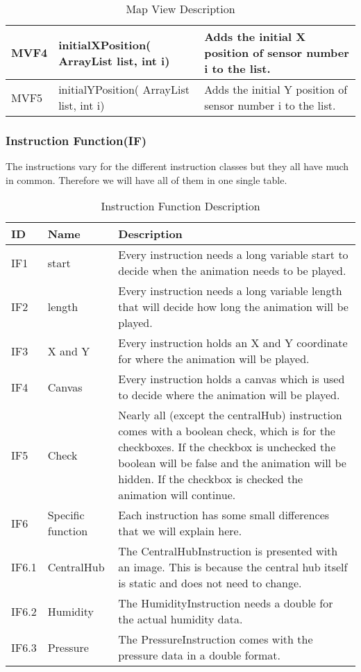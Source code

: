 \documentclass[../document]{subfiles}
\begin{document}
\begin{table}[H]
\caption{Map View Description}
\centering
\begin{tabularx}{\textwidth}{|l|L{3.5cm}|X|}
	\hline
	MVF4
	&initialXPosition( ArrayList list, int i)
	&Adds the initial X position of sensor number i to the list.
	\\ \hline MVF5
	&initialYPosition( ArrayList list, int i)
	&Adds the initial Y position of sensor number i to the list.
	\\ \hline 
\end{tabularx}
\end{table}

\subsubsection{Instruction Function(IF)}
The instructions vary for the different instruction classes but they all have much in common. Therefore we will have all of them in one single table.
\begin{table}[H]
\caption{Instruction Function Description}
\centering
\begin{tabularx}{\textwidth}{|l|l|X|}
	\hline
	ID
	&Name
	&Description
	\\ \hline IF1
	&start
	&Every instruction needs a long variable start to decide when the animation needs to be played.
	\\ \hline IF2
	&length
	&Every instruction needs a long variable length that will decide how long the animation will be played.
	\\ \hline IF3
	&X and Y
	&Every instruction holds an X and Y coordinate for where the animation will be played.
	\\ \hline IF4
	&Canvas
	&Every instruction holds a canvas which is used to decide where the animation will be played.
	\\ \hline IF5
	&Check
	&Nearly all (except the centralHub) instruction comes with a boolean check, which is for the checkboxes. If the checkbox is unchecked the boolean will be false and the animation will be hidden. If the checkbox is checked the animation will continue.
	\\ \hline IF6
	&Specific function
	&Each instruction has some small differences that we will explain here.
	\\ \hline IF6.1
	&CentralHub
	&The CentralHubInstruction is presented with an image. This is because the central hub itself is static and does not need to change.
	\\ \hline IF6.2
	&Humidity
	&The HumidityInstruction needs a double for the actual humidity data. 
	\\ \hline IF6.3
	&Pressure
	&The PressureInstruction comes with the pressure data in a double format.
	\\ \hline 
\end{tabularx}
\end{table}
\end{document}
